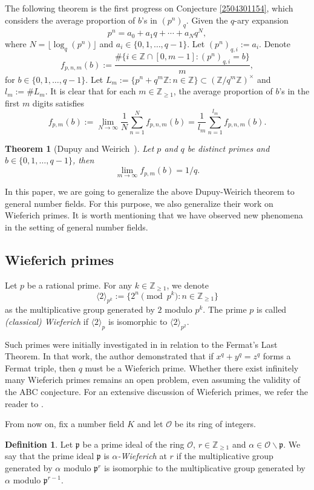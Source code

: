 \documentclass[12pt]{amsart}
\theoremstyle{plain}
\newtheorem*{thm*}{Theorem}
\theoremstyle{definition}
\newtheorem{defn}{Definition}[section]
\theoremstyle{remark}
\numberwithin{equation}{section}
\newcommand{\Z}{\mathbb Z}
\begin{document}
	The following theorem is the first progress on Conjecture \ref{2504301154}, which considers the average proportion of $b$'s in $(p^n)_q$. Given the $q$-ary expansion
	\[p^n=a_0+a_1q+\cdots+a_Nq^N,\]
	where $N=\lfloor\log_q(p^n)\rfloor$ and $a_i\in\{0,1,\dots,q-1\}$. Let $(p^n)_{q,i}:=a_i$. Denote
	\[f_{p,n,m}(b):=\frac{\#\{i\in\Z\cap[0,m-1]\colon (p^n)_{q,i}=b\}}{m},\]
	for $b\in\{0,1,\dots,q-1\}$. Let $L_m:=\{p^n+q^m\Z\colon n\in\Z\}\subset(\Z/q^m\Z)^\times$ and $l_m:=\#L_m$. It is clear that for each $m\in\Z_{\ge1}$, the average proportion of $b$'s in the first $m$ digits satisfies
	\begin{equation}\label{2504301428}
		f_{p,m}(b):=\lim_{N\to\infty}\frac{1}{N}\sum_{n=1}^{N}f_{p,n,m}(b)=\frac{1}{l_m}\sum_{n=1}^{l_m}f_{p,n,m}(b).
	\end{equation}
	\begin{thm*}[Dupuy and Weirich~{\cite[Theorem~3]{Dupuy2016a}}]
		Let $p$ and $q$ be distinct primes and $b\in\{0,1,\dots,q-1\}$, then
		\[\lim_{m\to\infty}f_{p,m}(b)=1/q.\]
	\end{thm*}
	
	In this paper, we are going to generalize the above Dupuy-Weirich theorem to general number fields. For this purpose, we also generalize their work \cite[Theorem~6]{Dupuy2016a} on Wieferich primes. It is worth mentioning that we have observed new phenomena in the setting of general number fields.  
	
	\subsection{Wieferich primes}
	Let $p$ be a rational prime. For any $k\in\Z_{\ge1}$, we denote \[\langle2\rangle_{p^k}:=\{2^n\!\!\pmod{p^k}\colon n\in\Z_{\ge1}\}\]
	as the multiplicative group generated by $2$ modulo $p^k$. 
	The prime $p$ is called \emph{(classical) Wieferich} if $\langle2\rangle_{p}$ is isomorphic to $\langle2\rangle_{p^2}$. 
	
	Such primes were initially investigated in \cite{Wie09} in relation to the Fermat's Last Theorem. In that work, the author demonstrated that if \( x^q + y^q = z^q \) forms a Fermat triple, then \( q \) must be a Wieferich prime. Whether there exist infinitely many Wieferich primes remains an open problem, even assuming the validity of the ABC conjecture. For an extensive discussion of Wieferich primes, we refer the reader to \cite{Crandall,Katz2015,Lang1990,Silverman1988}. 
	
	From now on, fix a number field $K$ and let  $\mathcal{O}$ be its ring of integers. 
	\begin{defn}
		Let $\mathfrak{p}$ be a prime ideal of the ring $\mathcal{O}$, $r\in\Z_{\ge1}$ and $\alpha\in\mathcal{O}\backslash\mathfrak{p}$. We say that the prime ideal $\mathfrak{p}$ is \emph{$\alpha$-Wieferich} at $r$ if the multiplicative group generated by $\alpha$ modulo $\mathfrak{p}^r$ is isomorphic to the multiplicative group generated by $\alpha$ modulo $\mathfrak{p}^{r-1}$.
	\end{defn}
	
\end{document}
